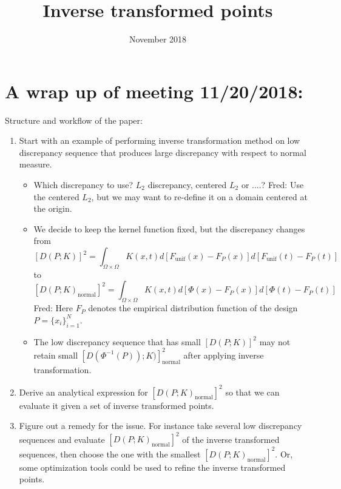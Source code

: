 \documentclass[12pt]{article}
\title{Inverse transformed points}
\author{ }
\date{November 2018}
\newcommand{\FJH}[1]{{\color{blue}Fred: #1}}
\begin{document}
\maketitle

\section{A wrap up of meeting 11/20/2018:}
Structure and workflow of the paper:
\begin{enumerate}
    \item 
    Start with an example of performing inverse transformation method on low discrepancy sequence that produces large discrepancy with respect to normal measure.
    \begin{itemize}
        \item 
        Which discrepancy to use? $L_2$ discrepancy, centered $L_2$ or ....? \FJH{Use the centered $L_2$, but we may want to re-define it on a domain centered at the origin.}
        \item
        We decide to keep the kernel function fixed, but the discrepancy changes from
        $$[D(P;K)]^2 = \int_{\Omega\times\Omega} K(x,t)d[F_{\text{unif}}(x)-F_P(x)]d[F_{\text{unif}}(t)-F_P(t)]$$
        to
        $$[D(P;K)_{\text{normal}}]^2 = \int_{\Omega\times\Omega} K(x,t)d[\Phi(x)-F_P(x)]d[\Phi(t)-F_P(t)]$$
        \FJH{Here $F_P$ denotes the empirical distribution function of the design $P= \{x_i\}_{i=1}^N$.}
        \item
        The low discrepancy sequence that has small $[D(P;K)]^2$ may not retain small $[D(\Phi^{-1}(P));K)]^2_{\text{normal}}$ after applying inverse transformation.
    \end{itemize}
    \item
    Derive an analytical expression for $[D(P;K)_{\text{normal}}]^2$ so that we can evaluate it given a set of inverse transformed points. 
    \item
    Figure out a remedy for the issue. For instance take several low discrepancy sequences and evaluate $[D(P;K)_{\text{normal}}]^2$ of the inverse transformed sequences, then choose the one with the smallest $[D(P;K)_{\text{normal}}]^2$. Or, some optimization tools could be used to refine the inverse transformed points.
\end{enumerate}
\end{document}
